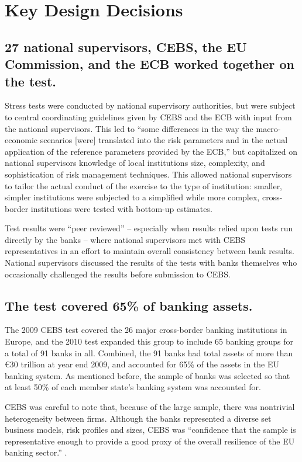 \documentclass[12pt]{article}
\begin{document}
\section{Key Design Decisions}\label{keydesign}

\subsection{27 national supervisors, CEBS, the EU Commission, and the ECB worked together on the test.}

Stress tests were conducted by national supervisory authorities, but were subject to central coordinating guidelines given by CEBS and the ECB with input from the national supervisors. This led to ``some differences in the way the macro-economic scenarios [were] translated into the risk parameters and in the actual application of the reference parameters provided by the ECB,'' but capitalized on national supervisors knowledge of local institutions size, complexity, and sophistication of risk management techniques. This allowed national supervisors to tailor the actual conduct of the exercise to the type of institution: smaller, simpler institutions were subjected to a simplified while more complex, cross-border institutions were tested with bottom-up estimates.

Test results were ``peer reviewed'' -- especially when results relied upon tests run directly by the banks -- where national supervisors met with CEBS representatives in an effort to maintain overall consistency between bank results. National supervisors discussed the results of the tests with banks themselves who occasionally challenged the results before submission to CEBS. \citep{Methodology}

\subsection{The test covered 65\% of banking assets.}

The 2009 CEBS test covered the 26 major cross-border banking institutions in Europe, and the 2010 test expanded this group to include 65 banking groups for a total of 91 banks in all. Combined, the 91 banks had total assets of more than \euro{30} trillion at year end 2009, and accounted for 65\% of the assets in the EU banking system. As mentioned before, the sample of banks was selected so that at least 50\% of each member state's banking system was accounted for.

CEBS was careful to note that, because of the large sample, there was nontrivial heterogeneity between firms. Although the banks represented a diverse set business models, risk profiles and sizes, CEBS was ``confidence that the sample is representative enough to provide a good proxy of the overall resilience of the EU banking sector.'' \citep{Methodology}.
\end{document}
